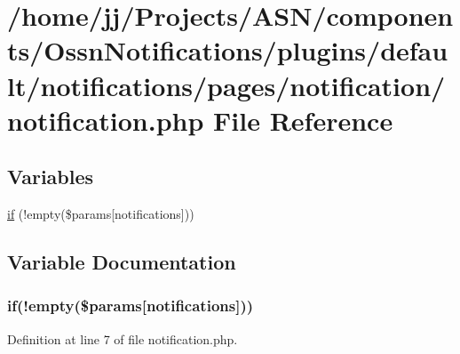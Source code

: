 \hypertarget{notification_8php}{}\section{/home/jj/\+Projects/\+A\+S\+N/components/\+Ossn\+Notifications/plugins/default/notifications/pages/notification/notification.php File Reference}
\label{notification_8php}
\subsection*{Variables}
\begin{DoxyCompactItemize}
\item 
\hyperlink{notification_8php_a4e28492bf8769c6de396020a335e084a}{if} (!empty(\$params\mbox{[}\textquotesingle{}notifications\textquotesingle{}\mbox{]}))
\end{DoxyCompactItemize}


\subsection{Variable Documentation}
\subsubsection[{\texorpdfstring{if}{if}}]{\setlength{\rightskip}{0pt plus 5cm}if(!empty(\$params\mbox{[}\textquotesingle{}notifications\textquotesingle{}\mbox{]}))}\hypertarget{notification_8php_a4e28492bf8769c6de396020a335e084a}{}\label{notification_8php_a4e28492bf8769c6de396020a335e084a}


Definition at line 7 of file notification.\+php.

